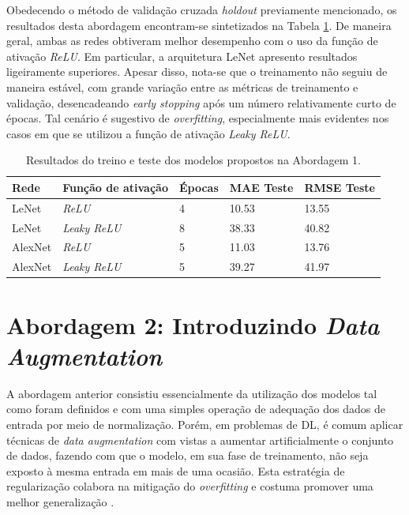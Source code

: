 	Obedecendo o método de validação cruzada \emph{holdout} previamente mencionado, os resultados desta abordagem encontram-se sintetizados na Tabela \ref{tab:results-1}. De maneira geral, ambas as redes obtiveram melhor desempenho com o uso da função de ativação \emph{ReLU}. Em particular,  a arquitetura LeNet apresento resultados ligeiramente superiores. Apesar disso, nota-se que o treinamento não seguiu de maneira estável, com grande variação entre as métricas de treinamento e validação, desencadeando \emph{early stopping} após um número relativamente curto de épocas. Tal cenário é sugestivo de \emph{overfitting}, especialmente mais evidentes nos casos em que se utilizou a função de ativação \emph{Leaky ReLU}.

  \begin{table}[!ht]
		\caption{Resultados do treino e teste dos modelos propostos na Abordagem 1.}
		\label{tab:results-1}
		\begin{center}
			\begin{tabular}{l l l l l}
				\toprule
				Rede & Função de ativação & Épocas & MAE Teste & RMSE Teste \\
				\midrule
				LeNet & \emph{ReLU}  & 4 & 10.53 & 13.55 \\
				LeNet & \emph{Leaky ReLU} & 8 & 38.33 & 40.82 \\
				AlexNet & \emph{ReLU}  & 5 & 11.03 & 13.76 \\
				AlexNet & \emph{Leaky ReLU} & 5 & 39.27 & 41.97 \\
				\bottomrule
			\end{tabular}
		\end{center}
	\end{table}

\section{Abordagem 2: Introduzindo \emph{Data Augmentation}}%

	A abordagem anterior consistiu essencialmente da utilização dos modelos tal como foram definidos e com uma simples operação de adequação dos dados de entrada por meio de normalização. Porém, em problemas de DL, é comum aplicar técnicas de \emph{data augmentation} com vistas a aumentar artificialmente o conjunto de dados, fazendo com que o modelo, em sua fase de treinamento, não seja exposto à mesma entrada em mais de uma ocasião. Esta estratégia de regularização colabora na mitigação do \emph{overfitting} e costuma promover uma melhor generalização \cite{chollet2017deep}.

